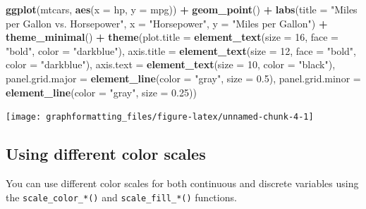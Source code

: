 \documentclass[
]{book}
\newenvironment{Shaded}{\begin{snugshade}}{\end{snugshade}}
\newcommand{\AttributeTok}[1]{\textcolor[rgb]{0.13,0.29,0.53}{#1}}
\newcommand{\DecValTok}[1]{\textcolor[rgb]{0.00,0.00,0.81}{#1}}
\newcommand{\FloatTok}[1]{\textcolor[rgb]{0.00,0.00,0.81}{#1}}
\newcommand{\FunctionTok}[1]{\textcolor[rgb]{0.13,0.29,0.53}{\textbf{#1}}}
\newcommand{\NormalTok}[1]{#1}
\newcommand{\SpecialCharTok}[1]{\textcolor[rgb]{0.81,0.36,0.00}{\textbf{#1}}}
\newcommand{\StringTok}[1]{\textcolor[rgb]{0.31,0.60,0.02}{#1}}
\begin{document}
\begin{Shaded}
\begin{Highlighting}[]
\FunctionTok{ggplot}\NormalTok{(mtcars, }\FunctionTok{aes}\NormalTok{(}\AttributeTok{x =}\NormalTok{ hp, }\AttributeTok{y =}\NormalTok{ mpg)) }\SpecialCharTok{+}
  \FunctionTok{geom\_point}\NormalTok{() }\SpecialCharTok{+}
  \FunctionTok{labs}\NormalTok{(}\AttributeTok{title =} \StringTok{"Miles per Gallon vs. Horsepower"}\NormalTok{,}
       \AttributeTok{x =} \StringTok{"Horsepower"}\NormalTok{,}
       \AttributeTok{y =} \StringTok{"Miles per Gallon"}\NormalTok{) }\SpecialCharTok{+}
  \FunctionTok{theme\_minimal}\NormalTok{() }\SpecialCharTok{+}
  \FunctionTok{theme}\NormalTok{(}\AttributeTok{plot.title =} \FunctionTok{element\_text}\NormalTok{(}\AttributeTok{size =} \DecValTok{16}\NormalTok{, }\AttributeTok{face =} \StringTok{"bold"}\NormalTok{, }\AttributeTok{color =} \StringTok{"darkblue"}\NormalTok{),}
        \AttributeTok{axis.title =} \FunctionTok{element\_text}\NormalTok{(}\AttributeTok{size =} \DecValTok{12}\NormalTok{, }\AttributeTok{face =} \StringTok{"bold"}\NormalTok{, }\AttributeTok{color =} \StringTok{"darkblue"}\NormalTok{),}
        \AttributeTok{axis.text =} \FunctionTok{element\_text}\NormalTok{(}\AttributeTok{size =} \DecValTok{10}\NormalTok{, }\AttributeTok{color =} \StringTok{"black"}\NormalTok{),}
        \AttributeTok{panel.grid.major =} \FunctionTok{element\_line}\NormalTok{(}\AttributeTok{color =} \StringTok{"gray"}\NormalTok{, }\AttributeTok{size =} \FloatTok{0.5}\NormalTok{),}
        \AttributeTok{panel.grid.minor =} \FunctionTok{element\_line}\NormalTok{(}\AttributeTok{color =} \StringTok{"gray"}\NormalTok{, }\AttributeTok{size =} \FloatTok{0.25}\NormalTok{))}
\end{Highlighting}
\end{Shaded}

\texttt{[image: graphformatting\_files/figure-latex/unnamed-chunk-4-1]}

\hypertarget{using-different-color-scales}{%
\subsection{Using different color scales}\label{using-different-color-scales}}

You can use different color scales for both continuous and discrete variables using the \texttt{scale\_color\_*()} and \texttt{scale\_fill\_*()} functions.
\end{document}
